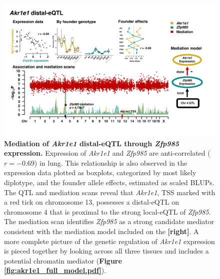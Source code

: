 \documentclass[9pt,twocolumn,twoside]{gsajnl}
\begin{document}
\begin{figure}[hp]
\renewcommand{\familydefault}{\sfdefault}\normalfont
\centering
\includegraphics[width=\textwidth, trim={0in 0.5in 0in 0in}, clip]{figs/akr1e1_mediation.pdf}
\caption{\textbf{Mediation of \textit{Akr1e1} distal-eQTL through \textit{Zfp985} expression.} Expression of \textit{Akr1e1} and \textit{Zfp985} are anti-correlated ($r = -0.69$) in lung. This relationship is also observed in the expression data plotted as boxplots, categorized by most likely diplotype, and the founder allele effects, estimated as scaled BLUPs. The QTL and mediation scans reveal that \textit{Akr1e1}, TSS marked with a red tick on chromosome 13, possesses a distal-eQTL on chromosome 4 that is proximal to the strong local-eQTL of \textit{Zfp985}. The mediation scan identifies \textit{Zfp985} as a strong candidate mediator consistent with the mediation model included on the \textbf{[right]}. A more complete picture of the genetic regulation of \textit{Akr1e1} expression is pieced together by looking across all three tissues and includes a potential chromatin mediator (\textbf{Figure \ref{fig:akr1e1_full_model.pdf}}).
\label{fig:akr1e1_exmediation}}
\end{figure}
\end{document}
